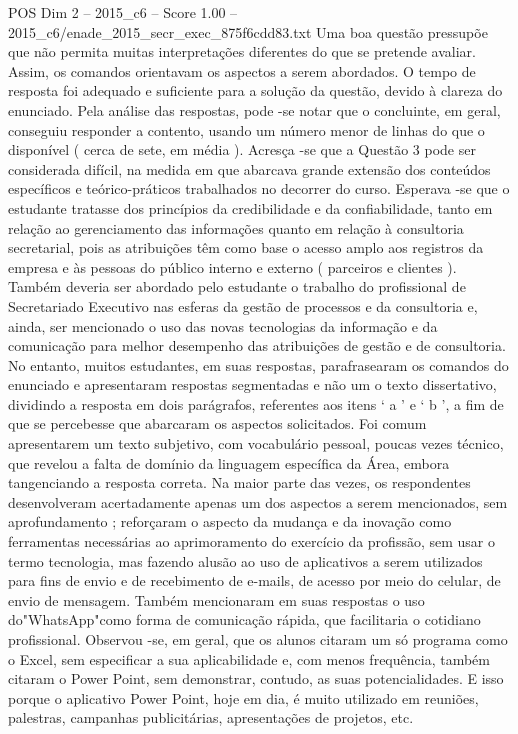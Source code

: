 \begin{textsample}{POS Dim 2 – 2015\_c6 – Score 1.00 – 2015\_c6/enade\_2015\_secr\_exec\_875f6cdd83.txt}
Uma boa questão pressupõe que não permita muitas interpretações diferentes do que se pretende avaliar.
Assim, os comandos orientavam os aspectos a serem abordados.
O tempo de resposta foi adequado e suficiente para a solução da questão, devido à clareza do enunciado.
Pela análise das respostas, pode -se notar que o concluinte, em geral, conseguiu responder a contento, usando um número menor de linhas do que o disponível ( cerca de sete, em média ).
Acresça -se que a Questão 3 pode ser considerada difícil, na medida em que abarcava grande extensão dos conteúdos específicos e teórico-práticos trabalhados no decorrer do curso.
Esperava -se que o estudante tratasse dos princípios da credibilidade e da confiabilidade, tanto em relação ao gerenciamento das informações quanto em relação à consultoria secretarial, pois as atribuições têm como base o acesso amplo aos registros da empresa e às pessoas do público interno e externo ( parceiros e clientes ).
Também deveria ser abordado pelo estudante o trabalho do profissional de Secretariado Executivo nas esferas da gestão de processos e da consultoria e, ainda, ser mencionado o uso das novas tecnologias da informação e da comunicação para melhor desempenho das atribuições de gestão e de consultoria.
No entanto, muitos estudantes, em suas respostas, parafrasearam os comandos do enunciado e apresentaram respostas segmentadas e não um o texto dissertativo, dividindo a resposta em dois parágrafos, referentes aos itens ‘ a ’ e ‘ b ’, a fim de que se percebesse que abarcaram os aspectos solicitados.
Foi comum apresentarem um texto subjetivo, com vocabulário pessoal, poucas vezes técnico, que revelou a falta de domínio da linguagem específica da Área, embora tangenciando a resposta correta.
Na maior parte das vezes, os respondentes desenvolveram acertadamente apenas um dos aspectos a serem mencionados, sem aprofundamento ; reforçaram o aspecto da mudança e da inovação como ferramentas necessárias ao aprimoramento do exercício da profissão, sem usar o termo tecnologia, mas fazendo alusão ao uso de aplicativos a serem utilizados para fins de envio e de recebimento de e-mails, de acesso por meio do celular, de envio de mensagem.
Também mencionaram em suas respostas o uso do"WhatsApp"como forma de comunicação rápida, que facilitaria o cotidiano profissional.
Observou -se, em geral, que os alunos citaram um só programa como o Excel, sem especificar a sua aplicabilidade e, com menos frequência, também citaram o Power Point, sem demonstrar, contudo, as suas potencialidades.
E isso porque o aplicativo Power Point, hoje em dia, é muito utilizado em reuniões, palestras, campanhas publicitárias, apresentações de projetos, etc.

\end{textsample}
